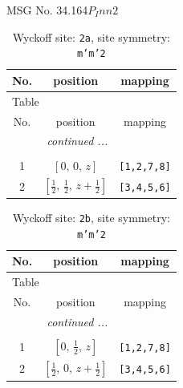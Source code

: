 \documentclass[fleqn,8pt]{jsarticle}
\begin{document}
\setcounter{MaxMatrixCols}{32}

\renewcommand{\tablename}{Table~}
\renewcommand{\figurename}{Figure~}
\begin{center}
\LARGE
MSG No. 34.164\quad$P_{I}nn2$
\end{center}
\renewcommand{\arraystretch}{1.2}
\begin{longtable}{ccc}
\caption{Wyckoff site: {\tt 2a}, site symmetry: {\tt m'm'2}}
 \\
 \hline \hline
No. & position & mapping \\ \hline \endfirsthead

\multicolumn{2}{l}{\tablename\ \thetable{}} \\
 \hline \hline
No. & position & mapping \\ \hline \endhead

 \hline \hline
\multicolumn{2}{r}{\footnotesize\it continued ...} \\ \endfoot

 \hline \hline
\multicolumn{2}{r}{} \\ \endlastfoot

1 & $\left[ 0,\, 0,\, z \right]$ & {\tt [1,2,7,8]} \\ \hline
2 & $\left[ \frac{1}{2},\, \frac{1}{2},\, z + \frac{1}{2} \right]$ & {\tt [3,4,5,6]} \\
\end{longtable}
\renewcommand{\arraystretch}{1.2}
\begin{longtable}{ccc}
\caption{Wyckoff site: {\tt 2b}, site symmetry: {\tt m'm'2}}
 \\
 \hline \hline
No. & position & mapping \\ \hline \endfirsthead

\multicolumn{2}{l}{\tablename\ \thetable{}} \\
 \hline \hline
No. & position & mapping \\ \hline \endhead

 \hline \hline
\multicolumn{2}{r}{\footnotesize\it continued ...} \\ \endfoot

 \hline \hline
\multicolumn{2}{r}{} \\ \endlastfoot

1 & $\left[ 0,\, \frac{1}{2},\, z \right]$ & {\tt [1,2,7,8]} \\ \hline
2 & $\left[ \frac{1}{2},\, 0,\, z + \frac{1}{2} \right]$ & {\tt [3,4,5,6]} \\
\end{longtable}
\end{document}
